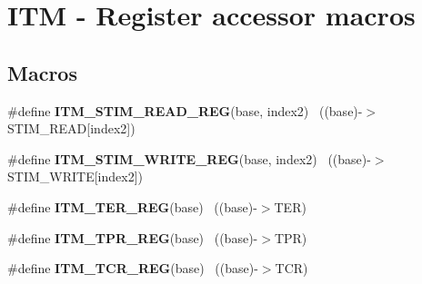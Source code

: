 \hypertarget{group___i_t_m___register___accessor___macros}{}\section{I\+T\+M -\/ Register accessor macros}
\label{group___i_t_m___register___accessor___macros}
\subsection*{Macros}
\begin{DoxyCompactItemize}
\item 
\hypertarget{group___i_t_m___register___accessor___macros_ga5009882336aadcd4f37b45cf3395c450}{}\#define {\bfseries I\+T\+M\+\_\+\+S\+T\+I\+M\+\_\+\+R\+E\+A\+D\+\_\+\+R\+E\+G}(base,  index2)                  ~((base)-\/$>$S\+T\+I\+M\+\_\+\+R\+E\+A\+D\mbox{[}index2\mbox{]})\label{group___i_t_m___register___accessor___macros_ga5009882336aadcd4f37b45cf3395c450}

\item 
\hypertarget{group___i_t_m___register___accessor___macros_ga049ca92a4e78e77c19af81e51aa73f1c}{}\#define {\bfseries I\+T\+M\+\_\+\+S\+T\+I\+M\+\_\+\+W\+R\+I\+T\+E\+\_\+\+R\+E\+G}(base,  index2)                ~((base)-\/$>$S\+T\+I\+M\+\_\+\+W\+R\+I\+T\+E\mbox{[}index2\mbox{]})\label{group___i_t_m___register___accessor___macros_ga049ca92a4e78e77c19af81e51aa73f1c}

\item 
\hypertarget{group___i_t_m___register___accessor___macros_ga0952675d3a89701dd186427f1c52c919}{}\#define {\bfseries I\+T\+M\+\_\+\+T\+E\+R\+\_\+\+R\+E\+G}(base)                                            ~((base)-\/$>$T\+E\+R)\label{group___i_t_m___register___accessor___macros_ga0952675d3a89701dd186427f1c52c919}

\item 
\hypertarget{group___i_t_m___register___accessor___macros_gaae645266e2d2ce5b4085486432dee954}{}\#define {\bfseries I\+T\+M\+\_\+\+T\+P\+R\+\_\+\+R\+E\+G}(base)                                            ~((base)-\/$>$T\+P\+R)\label{group___i_t_m___register___accessor___macros_gaae645266e2d2ce5b4085486432dee954}

\item 
\hypertarget{group___i_t_m___register___accessor___macros_gaded31ba9ed7d78748d2ec3fb8746caff}{}\#define {\bfseries I\+T\+M\+\_\+\+T\+C\+R\+\_\+\+R\+E\+G}(base)                                            ~((base)-\/$>$T\+C\+R)\label{group___i_t_m___register___accessor___macros_gaded31ba9ed7d78748d2ec3fb8746caff}


\end{DoxyCompactItemize}
